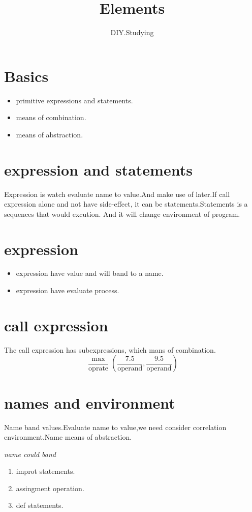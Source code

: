 \documentclass{article}
\title{Elements}
\author{DIY.Studying}
\begin{document}
 \maketitle
\section{Basics}
     \begin{itemize}
         \item primitive expressions and statements.
         \item means of combination.
         \item means of abstraction.
     \end{itemize}
\section{expression and statements}
Expression is watch evaluate name to value.And make use of later.If call expression alone and not have side-effect, it can be statements.Statements is a sequences that would excution. And it will change environment of program.
\section{expression}
 \begin{itemize}
     \item expression have value and will band to a name.
     \item expression have evaluate process.
 \end{itemize}
\section{call expression}
 The call expression has subexpressions, which mans of combination.
 \begin{equation*}
     \frac{\operatorname{max}}{\operatorname{oprate}}(\frac{7.5}{\operatorname{operand}},\frac{9.5}{\operatorname{operand}})
 \end{equation*}
  \newpage
 \section{names and environment}
 Name band values.Evaluate name to value,we need consider correlation environment.Name means of abstraction.

 \begin{center}
     \emph{name could band}
 \end{center}
 \begin{enumerate}
     \item improt statements.
     \item assingment operation.
     \item def statements.
 \end{enumerate}
\end{document}
